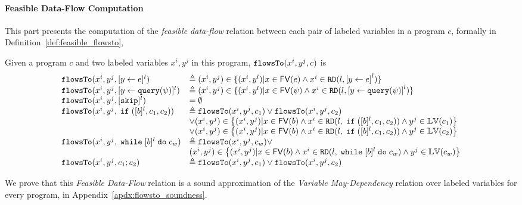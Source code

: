 \paragraph{Feasible Data-Flow Computation}
This part presents the computation of the \emph{feasible data-flow} relation between each pair of labeled variables in a program $c$,
formally in Definition~\ref{def:feasible_flowsto}, 
%
%
\begin{defn}
  \label{def:feasible_flowsto}
  Given a program $c$ and two labeled variables $x^i, y^j$  in this program, 
  $\mathtt{flowsTo}(x^i, y^j, c)$ is 
    {\small
    \[
   \begin{array}{ll}
    \flowsto(x^i, y^j, \clabel{\assign{y}{\expr}}{}^l)  & \triangleq (x^i, y^j) \in \{ (x^i, y^l) | x \in \mathsf{FV}(\expr) 
    \land x^i \in \live(l, \clabel{\assign{y}{\expr}}^l) \}  \\
    \flowsto(x^i, y^j, \clabel{\assign{y}{\query(\qexpr)}}{}^l)  & \triangleq (x^i, y^j) \in \{ (x^i, y^l) | x \in \mathsf{FV}(\qexpr) 
    \land x^i \in \live(l,\clabel{\assign{y}{\query(\qexpr)}}^l) \}  \\
    \flowsto(x^i, y^j, [\eskip]^{l})  & = \emptyset \\
    \flowsto(x^i, y^j, \eif ([b]^l, c_1, c_2))  & \triangleq \flowsto(x^i, y^j, c_1) \lor \flowsto(x^i, y^j, c_2) \\ 
        & \lor (x^i, y^j) \in
        \left\{(x^i,y^j) | x \in \mathsf{FV}(b) \land 
      x^i \in \live(l, \eif ([b]^l, c_1, c_2)) \land  y^j \in \lvar(c_1) \right\} \\
       &\lor (x^i, y^j) \in \left\{(x^i,y^j) | x \in \mathsf{FV}(b) \land 
      x^i\in \live(l, \eif ([b]^l, c_1, c_2))  \land  y^j \in \lvar(c_2)  \right\} \\
       \flowsto(x^i, y^j, \ewhile [b]^l \edo c_w)  & \triangleq  \flowsto(x^i, y^j, c_w)  \lor
       \\ & 
       (x^i, y^j) \in  \left\{(x^i,y^j) | x \in \mathsf{FV}(b) \land 
      x^i \in \live(l,   \ewhile [b]^l \edo c_w) \land  y^j \in \lvar(c_w) \right\} \\
       \flowsto(x^i, y^j, c_1 ;c_2)  & \triangleq \flowsto(x^i, y^j, c_1) \lor \flowsto(x^i, y^j, c_2) \\
   \end{array}
   \]
   }
   \end{defn}
%
We prove that this \emph{Feasible Data-Flow} relation is a sound approximation 
of the \emph{Variable May-Dependency} relation over labeled variables for every program,
in Appendix~\ref{apdx:flowsto_soundness}.
%

